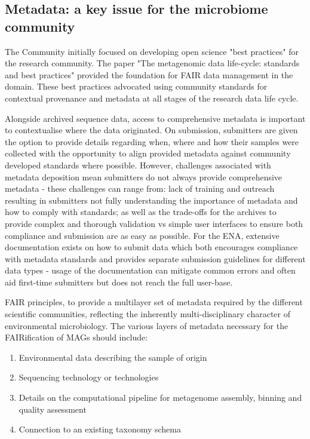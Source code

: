 \subsection{Metadata: a key issue for the microbiome community}

The Community initially focused on developing open science "best practices" for the research community. 
The paper "The metagenomic data life-cycle: standards and best practices" \citep{ten2017metagenomic} provided the foundation for FAIR data management in the domain. 
These best practices advocated using community standards for contextual provenance and metadata at all stages of the research data life cycle.

Alongside archived sequence data, access to comprehensive metadata is important to contextualise where the data originated. 
On submission, submitters are given the option to provide details regarding when, where and how their samples were collected with the opportunity to align provided metadata against community developed standards where possible. 
However, challenges associated with metadata deposition mean submitters do not always provide comprehensive metadata - these challenges can range from: 
lack of training and outreach resulting in submitters not fully understanding the importance of metadata and how to comply with standards; 
as well as the trade-offs for the archives to provide complex and thorough validation vs simple user interfaces to ensure both compliance and submission are as easy as possible. 
For the ENA, extensive documentation exists on how to submit data which both encourages compliance with metadata standards and provides separate submission guidelines for different data types - usage of the documentation can mitigate common errors and often aid first-time submitters but does not reach the full user-base. 

FAIR principles, to provide a multilayer set of metadata required by the different scientific communities, reflecting the inherently multi-disciplinary character of environmental microbiology. 
The various layers of metadata necessary for the FAIRification of MAGs should include:
\begin{enumerate}
   \item Environmental data describing the sample of origin
   \item Sequencing technology or technologies
   \item Details on the computational pipeline for metagenome assembly, binning and quality assessment
   \item Connection to an existing taxonomy schema
\end{enumerate}



